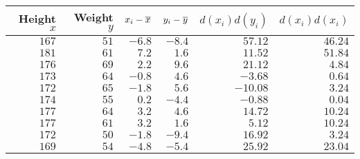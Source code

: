 \begin{tabular}{rrrrrr}                                                                    \toprule
Height $x$ & Weight $y$ & $x_i - \overline{x}$ & $y_i - \overline{y}$ & $d(x_i)d(y_i)$ & $d(x_i)d(x_i)$ \\\midrule
$167$      & $51$       & $-6.8$        & $-8.4$        & $57.12$       & $46.24$        \\[4pt]
$181$      & $61$       & $7.2$         & $1.6$         & $11.52$       & $51.84$        \\[4pt]
$176$      & $69$       & $2.2$         & $9.6$         & $21.12$       & $4.84$         \\[4pt]
$173$      & $64$       & $-0.8$        & $4.6$         & $-3.68$       & $0.64$         \\[4pt]
$172$      & $65$       & $-1.8$        & $5.6$         & $-10.08$      & $3.24$         \\[4pt]
$174$      & $55$       & $0.2$         & $-4.4$        & $-0.88$       & $0.04$         \\[4pt]
$177$      & $64$       & $3.2$         & $4.6$         & $14.72$       & $10.24$        \\[4pt]
$177$      & $61$       & $3.2$         & $1.6$         & $5.12$        & $10.24$        \\[4pt]
$172$      & $50$       & $-1.8$        & $-9.4$        & $16.92$       & $3.24$         \\[4pt]
$169$      & $54$       & $-4.8$        & $-5.4$        & $25.92$       & $23.04$        \\\bottomrule
\end{tabular}
